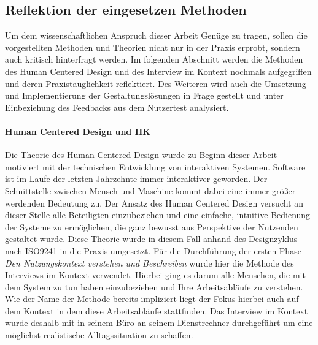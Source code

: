 \subsection{Reflektion der eingesetzen Methoden}
\label{subsection:reflection}

Um dem wissenschaftlichen Anspruch dieser Arbeit Genüge zu tragen, sollen die
vorgestellten Methoden und Theorien nicht nur in der Praxis erprobt, sondern
auch kritisch hinterfragt werden. Im folgenden Abschnitt werden die Methoden
des Human Centered Design und des Interview im Kontext nochmals aufgegriffen
und deren Praxistauglichkeit reflektiert. Des Weiteren wird auch die Umsetzung
und Implementierung der Gestaltungslösungen in Frage gestellt und unter
Einbeziehung des Feedbacks aus dem Nutzertest analysiert.

\paragraph{Human Centered Design und IIK}
Die Theorie des Human Centered Design wurde zu Beginn dieser Arbeit motiviert
mit der technischen Entwicklung von interaktiven Systemen. Software ist im
Laufe der letzten Jahrzehnte immer interaktiver geworden. Der Schnittstelle
zwischen Mensch und Maschine kommt dabei eine immer größer werdenden Bedeutung
zu. Der Ansatz des Human Centered Design versucht an dieser Stelle alle
Beteiligten einzubeziehen und eine einfache, intuitive Bedienung der Systeme zu
ermöglichen, die ganz bewusst aus Perspektive der Nutzenden gestaltet wurde.
Diese Theorie wurde in diesem Fall anhand des Designzyklus nach ISO9241 in die
Praxis umgesetzt. Für die Durchführung der ersten Phase \textit{Den
    Nutzungskontext verstehen und Beschreiben} wurde hier die Methode des
Interviews im Kontext verwendet. Hierbei ging es darum alle Menschen, die mit
dem System zu tun haben einzubeziehen und Ihre Arbeitsabläufe zu verstehen. Wie
der Name der Methode bereits impliziert liegt der Fokus hierbei auch auf dem
Kontext in dem diese Arbeitsabläufe stattfinden. Das Interview im Kontext wurde
deshalb mit \ipName in seinem Büro an seinem Dienstrechner durchgeführt um eine
möglichst realistische Alltagssituation zu schaffen.

